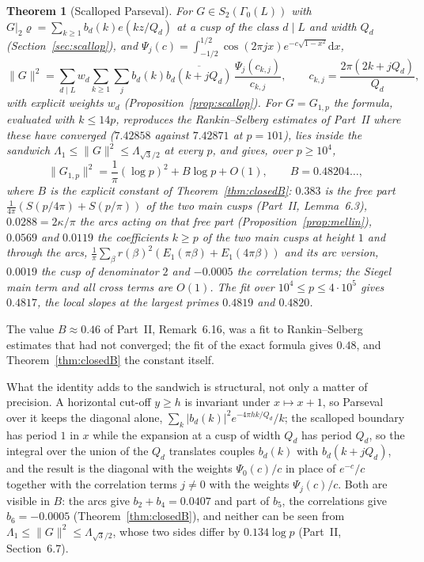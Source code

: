 \documentclass[11pt]{amsart}
\newtheorem{theorem}{Theorem}[section]
\theoremstyle{remark}
\newcommand{\dd}{\mathrm{d}}
\begin{document}
\begin{theorem}[Scalloped Parseval]\label{thm:A}
For $G\in S_2(\Gamma_0(L))$ with $G|_2\varrho=\sum_{k\ge1}b_d(k)e(kz/Q_d)$ at a cusp of the class $d\mid L$ and width $Q_d$ (Section~\ref{sec:scallop}), and $\Psi_j(c)=\int_{-1/2}^{1/2}\cos(2\pi jx)e^{-c\sqrt{1-x^2}}\dd x$,
\[
\|G\|^2=\sum_{d\mid L}w_d\sum_{k\ge1}\sum_{j}b_d(k)\overline{b_d(k+jQ_d)}\,\frac{\Psi_j(c_{k,j})}{c_{k,j}},\qquad c_{k,j}=\frac{2\pi(2k+jQ_d)}{Q_d},
\]
with explicit weights $w_d$ (Proposition~\ref{prop:scallop}). For $G=G_{1,p}$ the formula, evaluated with $k\le14p$, reproduces the Rankin--Selberg estimates of Part~II where these have converged ($7.42858$ against $7.42871$ at $p=101$), lies inside the sandwich $\Lambda_1\le\|G\|^2\le\Lambda_{\sqrt3/2}$ at every $p$, and gives, over $p\ge10^4$,
\[
\|G_{1,p}\|^2=\frac1\pi(\log p)^2+B\log p+O(1),\qquad B=0.48204\ldots,
\]
where $B$ is the explicit constant of Theorem~\ref{thm:closedB}: $0.383$ is the free part $\frac1{4\pi}(S(p/4\pi)+S(p/\pi))$ of the two main cusps (Part~II, Lemma~6.3), $0.0288=2\kappa/\pi$ the arcs acting on that free part (Proposition~\ref{prop:mellin}), $0.0569$ and $0.0119$ the coefficients $k\ge p$ of the two main cusps at height $1$ and through the arcs, $\frac1\pi\sum_\beta r(\beta)^2(E_1(\pi\beta)+E_1(4\pi\beta))$ and its arc version, $0.0019$ the cusp of denominator $2$ and $-0.0005$ the correlation terms; the Siegel main term and all cross terms are $O(1)$. The fit over $10^4\le p\le4\cdot10^5$ gives $0.4817$, the local slopes at the largest primes $0.4819$ and $0.4820$.
\end{theorem}

The value $B\approx0.46$ of Part~II, Remark~6.16, was a fit to Rankin--Selberg estimates that had not converged; the fit of the exact formula gives $0.48$, and Theorem~\ref{thm:closedB} the constant itself.

What the identity adds to the sandwich is structural, not only a matter of precision. A horizontal cut-off $y\ge h$ is invariant under $x\mapsto x+1$, so Parseval over it keeps the diagonal alone, $\sum_k|b_d(k)|^2e^{-4\pi hk/Q_d}/k$; the scalloped boundary has period $1$ in $x$ while the expansion at a cusp of width $Q_d$ has period $Q_d$, so the integral over the union of the $Q_d$ translates couples $b_d(k)$ with $b_d(k+jQ_d)$, and the result is the diagonal with the weights $\Psi_0(c)/c$ in place of $e^{-c}/c$ together with the correlation terms $j\ne0$ with the weights $\Psi_j(c)/c$. Both are visible in $B$: the arcs give $b_2+b_4=0.0407$ and part of $b_5$, the correlations give $b_6=-0.0005$ (Theorem~\ref{thm:closedB}), and neither can be seen from $\Lambda_1\le\|G\|^2\le\Lambda_{\sqrt3/2}$, whose two sides differ by $0.134\log p$ (Part~II, Section~6.7).
\end{document}
